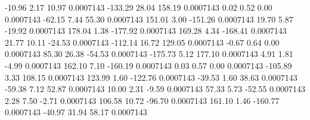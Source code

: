       -10.96        2.17       10.97     0.0007143
     -133.29       28.04      158.19     0.0007143
        0.02        0.52        0.00     0.0007143
      -62.15        7.44       55.30     0.0007143
      151.01        3.00     -151.26     0.0007143
       19.70        5.87      -19.92     0.0007143
      178.04        1.38     -177.92     0.0007143
      169.28        4.34     -168.41     0.0007143
       21.77       10.11      -24.53     0.0007143
     -112.14       16.72      129.05     0.0007143
       -0.67        0.64        0.00     0.0007143
       85.30       26.38      -54.53     0.0007143
     -175.73        5.12      177.10     0.0007143
        4.91        1.81       -4.99     0.0007143
      162.10        7.10     -160.19     0.0007143
        0.03        0.57        0.00     0.0007143
     -105.89        3.33      108.15     0.0007143
      123.99        1.60     -122.76     0.0007143
      -39.53        1.60       38.63     0.0007143
      -59.38        7.12       52.87     0.0007143
       10.00        2.31       -9.59     0.0007143
       57.33        5.73      -52.55     0.0007143
        2.28        7.50       -2.71     0.0007143
      106.58       10.72      -96.70     0.0007143
      161.10        1.46     -160.77     0.0007143
      -40.97       31.94       58.17     0.0007143
